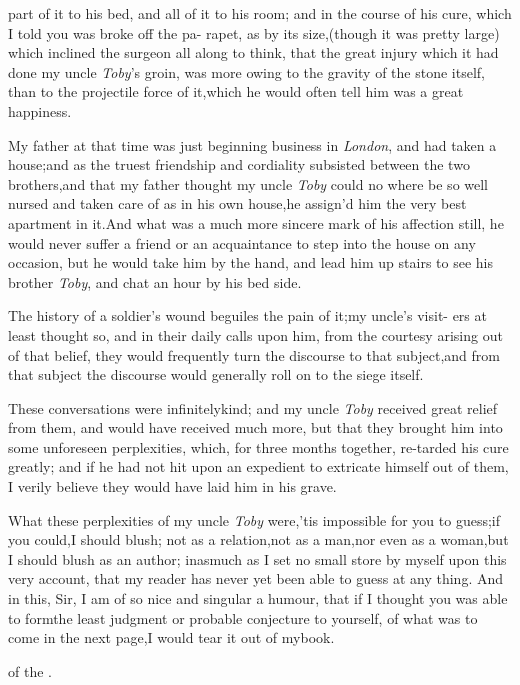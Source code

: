 \documentclass{article}
\begin{document}
\noindent
{}
part of it to his bed, and all of it to his 
room; and in the course of his cure,\break
{}
which I told you was broke off the pa-
rapet,\tsk
as by its size,\tsk (though it was pretty large) which inclined
the surgeon all along to think, that the great injury which it
had done my uncle \textit{Toby}’s groin, was more owing to the
gravity of the stone itself, than to the projectile force of
it,\tsk which he would often tell him was a great happiness.

My father at that time was just beginning business in
\textit{London}, and had taken a house;\tsk and as the truest
friendship and cordiality subsisted between the two
brothers,\tsk and that my father thought my uncle \textit{Toby} could no where be so well nursed
and taken care of as in his own house,\tsh he
assign’d him the very best apartment in it.\tsk And what
was a much more sincere mark of his affection still, he would never
suffer a friend or an acquaintance to step into the house on
any
occasion, but he would take him by the hand, and lead him up stairs
to see his brother \textit{Toby}, and chat an hour by his
bed side.

The history of a soldier’s wound beguiles the pain of
it;\tsk my uncle’s visit-\break
ers at least thought so, and in their daily\break
calls upon him, from the courtesy arising\break
out of that belief, they would frequently\break
turn the discourse to that subject,\tsk and\break
from that subject the discourse would\break
generally roll on to the siege itself.

These conversations were infinitely\break kind; and my uncle
\textit{Toby} received great relief from them, and would have
recei\-ved much more, but that they brought him into some unforeseen
perplexities, which, for three months together, re-\break tarded his
cure greatly; and if he had not hit upon an
expedient to extricate himself out of them, I verily believe they
would have laid him in his grave.

What these perplexities of my uncle \textit{Toby}
were,\tsh ’tis impossible for you to guess;\tsk if
you could,\tsk I should blush; not as a relation,\tsk not as a
man,\tsk nor even as a woman,\tsk but I should blush as an
author; inasmuch as I set no small store by myself upon this very
account, that my reader has never yet been able to guess at any
thing. And in this, Sir, I am of so nice and singular a humour,
that if I thought you was able to form\break the least judgment or
probable conjecture to yourself, of what was to come in the next
page,\tsk I would tear it out of my\break book.

\bigskip
\centerline{\kern 4pt of the .}
\newpage\pagestyle{empty}\null
\end{document}
